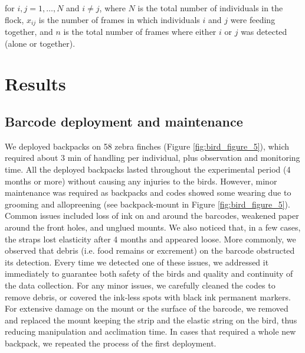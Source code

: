 \documentclass[11pt,a4paper,oneside]{book}
\begin{document}
\begin{doublespace}
for $i, j = 1, \dots, N$ and $i \neq j$, where $N$ is the total number of individuals in the flock, $x_{ij}$ is the number of frames in which individuals $i$ and $j$ were feeding together, and $n$ is the total number of frames where either $i$ or $j$ was detected (alone or together).

\section{Results}
\subsection{Barcode deployment and maintenance}
We deployed backpacks on 58 zebra finches (Figure \ref{fig:bird_figure_5}), which required about 3 min of handling per individual, plus observation and monitoring time. All the deployed backpacks lasted throughout the experimental period (4 months or more) without causing any injuries to the birds. However, minor maintenance was required as backpacks and codes showed some wearing due to grooming and allopreening (see backpack‐mount in Figure \ref{fig:bird_figure_5}). Common issues included loss of ink on and around the barcodes, weakened paper around the front holes, and unglued mounts. We also noticed that, in a few cases, the straps lost elasticity after 4 months and appeared loose. More commonly, we observed that debris (i.e. food remains or excrement) on the barcode obstructed its detection. Every time we detected one of these issues, we addressed it immediately to guarantee both safety of the birds and quality and continuity of the data collection. For any minor issues, we carefully cleaned the codes to remove debris, or covered the ink‐less spots with black ink permanent markers. For extensive damage on the mount or the surface of the barcode, we removed and replaced the mount keeping the strip and the elastic string on the bird, thus reducing manipulation and acclimation time. In cases that required a whole new backpack, we repeated the process of the first deployment.


\end{doublespace}
\end{document}
